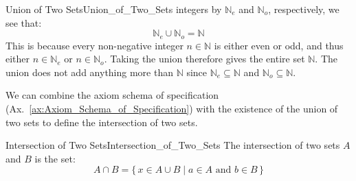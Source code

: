 \begin{lexample}{Union of Two Sets}{Union_of_Two_Sets}
            integers by $\mathbb{N}_{e}$ and $\mathbb{N}_{o}$, respectively,
            we see that:
            \begin{equation}
                \mathbb{N}_{e}\cup\mathbb{N}_{o}=\mathbb{N}
            \end{equation}
            This is because every non-negative integer $n\in\mathbb{N}$ is
            either even or odd, and thus either $n\in\mathbb{N}_{e}$ or
            $n\in\mathbb{N}_{o}$. Taking the union therefore gives the entire
            set $\mathbb{N}$. The union does not add anything more than
            $\mathbb{N}$ since $\mathbb{N}_{e}\subseteq\mathbb{N}$ and
            $\mathbb{N}_{o}\subseteq\mathbb{N}$.
        \end{lexample}
        We can combine the axiom schema of specification
        (Ax.~\ref{ax:Axiom_Schema_of_Specification}) with the existence of
        the union of two sets to define the intersection of two sets.
        \begin{fdefinition}{Intersection of Two Sets}{Intersection_of_Two_Sets}
            The intersection of two sets $A$ and $B$ is the set:
            \begin{equation}
                A\cap{B}=\{\,x\in{A}\cup{B}\;|\;a\in{A}\textrm{ and }b\in{B}\,\}
            \end{equation}
        \end{fdefinition}
